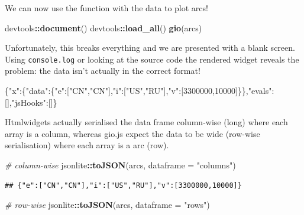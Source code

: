 \documentclass[
]{krantz}
\makeatletter
\newenvironment{Shaded}{\begin{snugshade}}{\end{snugshade}}
\newcommand{\CommentTok}[1]{\textcolor[rgb]{0.37,0.37,0.37}{\textit{#1}}}
\newcommand{\DataTypeTok}[1]{\textcolor[rgb]{0.27,0.27,0.27}{#1}}
\newcommand{\DecValTok}[1]{\textcolor[rgb]{0.06,0.06,0.06}{#1}}
\newcommand{\FunctionTok}[1]{\textcolor[rgb]{0,0,0}{#1}}
\newcommand{\KeywordTok}[1]{\textcolor[rgb]{0.27,0.27,0.27}{\textbf{#1}}}
\newcommand{\NormalTok}[1]{#1}
\newcommand{\OperatorTok}[1]{\textcolor[rgb]{0.43,0.43,0.43}{\textbf{#1}}}
\newcommand{\OtherTok}[1]{\textcolor[rgb]{0.37,0.37,0.37}{#1}}
\newcommand{\StringTok}[1]{\textcolor[rgb]{0.5,0.5,0.5}{#1}}
\newenvironment{kframe}{%
\medskip{}
\setlength{\fboxsep}{.8em}
 \def\at@end@of@kframe{}%
 \ifinner\ifhmode%
  \def\at@end@of@kframe{\end{minipage}}%
  \begin{minipage}{\columnwidth}%
 \fi\fi%
 \def\FrameCommand##1{\hskip\@totalleftmargin \hskip-\fboxsep
 \colorbox{shadecolor}{##1}\hskip-\fboxsep
     \hskip-\linewidth \hskip-\@totalleftmargin \hskip\columnwidth}%
 \MakeFramed {\advance\hsize-\width
   \@totalleftmargin\z@ \linewidth\hsize
   \@setminipage}}%
 {\par\unskip\endMakeFramed%
 \at@end@of@kframe}
\renewenvironment{Shaded}{\begin{kframe}}{\end{kframe}}
\makeatother
\begin{document}
We can now use the function with the data to plot arcs!

\begin{Shaded}
\begin{Highlighting}[]
\NormalTok{devtools}\OperatorTok{::}\KeywordTok{document}\NormalTok{()}
\NormalTok{devtools}\OperatorTok{::}\KeywordTok{load\_all}\NormalTok{()}
\KeywordTok{gio}\NormalTok{(arcs)}
\end{Highlighting}
\end{Shaded}

Unfortunately, this breaks everything and we are presented with a blank screen. Using \texttt{console.log} or looking at the source code the rendered widget reveals the problem: the data isn't actually in the correct format!

\begin{Shaded}
\begin{Highlighting}[]
\FunctionTok{\{}\DataTypeTok{"x"}\FunctionTok{:\{}\DataTypeTok{"data"}\FunctionTok{:\{}\DataTypeTok{"e"}\FunctionTok{:}\OtherTok{[}\StringTok{"CN"}\OtherTok{,}\StringTok{"CN"}\OtherTok{]}\FunctionTok{,}\DataTypeTok{"i"}\FunctionTok{:}\OtherTok{[}\StringTok{"US"}\OtherTok{,}\StringTok{"RU"}\OtherTok{]}\FunctionTok{,}\DataTypeTok{"v"}\FunctionTok{:}\OtherTok{[}\DecValTok{3300000}\OtherTok{,}\DecValTok{10000}\OtherTok{]}\FunctionTok{\}\},}\DataTypeTok{"evals"}\FunctionTok{:}\OtherTok{[]}\FunctionTok{,}\DataTypeTok{"jsHooks"}\FunctionTok{:}\OtherTok{[]}\FunctionTok{\}}
\end{Highlighting}
\end{Shaded}

Htmlwidgets actually serialised the data frame column-wise (long) where each array is a column, whereas gio.js expect the data to be wide (row-wise serialisation) where each array is a arc (row).

\begin{Shaded}
\begin{Highlighting}[]
\CommentTok{\# column{-}wise}
\NormalTok{jsonlite}\OperatorTok{::}\KeywordTok{toJSON}\NormalTok{(arcs, }\DataTypeTok{dataframe =} \StringTok{"columns"}\NormalTok{)}
\end{Highlighting}
\end{Shaded}

\begin{verbatim}
## {"e":["CN","CN"],"i":["US","RU"],"v":[3300000,10000]}
\end{verbatim}

\begin{Shaded}
\begin{Highlighting}[]
\CommentTok{\# row{-}wise}
\NormalTok{jsonlite}\OperatorTok{::}\KeywordTok{toJSON}\NormalTok{(arcs, }\DataTypeTok{dataframe =} \StringTok{"rows"}\NormalTok{)}
\end{Highlighting}
\end{Shaded}
\end{document}

